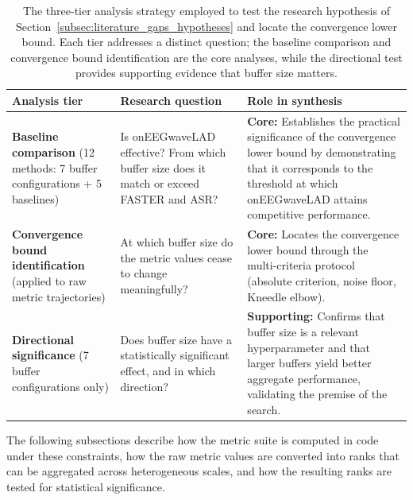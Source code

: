 \documentclass[MScCS,12pt,oneside,final]{uccthesis}
\begin{document}
\begin{table}[!htb]
    \centering
    \begin{tabularx}{\textwidth}{@{} >{\raggedright\arraybackslash}p{3.0cm} >{\raggedright\arraybackslash}p{4.0cm} >{\raggedright\arraybackslash}X @{}}
        \toprule
        \textbf{Analysis tier} & \textbf{Research question} & \textbf{Role in synthesis} \\
        \midrule
        \textbf{Baseline comparison} (12 methods: 7 buffer configurations + 5 baselines) & 
        Is onEEGwaveLAD effective? From which buffer size does it match or exceed FASTER and ASR? & 
        \textbf{Core:} Establishes the practical significance of the convergence lower bound by 
        demonstrating that it corresponds to the threshold at which onEEGwaveLAD attains 
        competitive performance. \\
        \addlinespace
        \textbf{Convergence bound identification} (applied to raw metric trajectories) & 
        At which buffer size do the metric values cease to change meaningfully? & 
        \textbf{Core:} Locates the convergence lower bound through the multi-criteria protocol 
        (absolute criterion, noise floor, Kneedle elbow). \\
        \addlinespace
        \textbf{Directional significance} (7 buffer configurations only) & 
        Does buffer size have a statistically significant effect, and in which direction? & 
        \textbf{Supporting:} Confirms that buffer size is a relevant hyperparameter and that 
        larger buffers yield better aggregate performance, validating the premise of the search. \\
        \bottomrule
    \end{tabularx}
    \caption{The three-tier analysis strategy employed to test the research hypothesis of 
    Section~\ref{subsec:literature_gaps_hypotheses} and locate the convergence lower bound. 
    Each tier addresses a distinct question; the baseline comparison and convergence bound 
    identification are the core analyses, while the directional test provides supporting 
    evidence that buffer size matters.}
    \label{tab:three_tier_analysis}
\end{table}

The following subsections describe how the metric suite is computed in code under these constraints, how the raw metric values are converted into ranks that can be aggregated across 
heterogeneous scales, and how the resulting ranks are tested for statistical significance.
\end{document}
